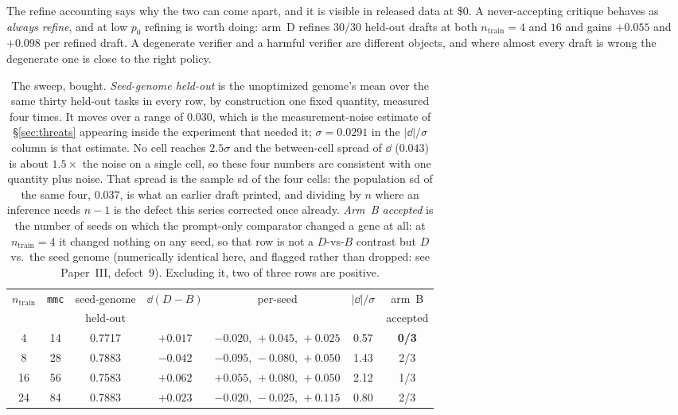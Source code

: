 \documentclass[11pt]{article}
\begin{document}
The refine accounting says why the two can come apart, and it is visible in released data at
\$0. A never-accepting critique behaves as \emph{always refine}, and at low $p_0$
refining is worth doing: arm~D refines $30/30$ held-out drafts at both $n_{\mathrm{train}}{=}4$
and $16$ and gains $+0.055$ and $+0.098$ per refined draft. A degenerate verifier and a harmful
verifier are different objects, and where almost every draft is wrong the degenerate one is
close to the right policy.

\begin{table}[h]
\centering
\small
\begin{tabular}{ccccccc}
\toprule
$n_{\mathrm{train}}$ & \texttt{mmc} & seed-genome & $\dd(D-B)$ & per-seed & $|\dd|/\sigma$ & arm~B \\
 & & held-out & & & & accepted \\
\midrule
4  & 14 & 0.7717 & $+0.017$ & $-0.020,\,+0.045,\,+0.025$ & 0.57 & \textbf{0/3} \\
8  & 28 & 0.7883 & $-0.042$ & $-0.095,\,-0.080,\,+0.050$ & 1.43 & 2/3 \\
16 & 56 & 0.7583 & $+0.062$ & $+0.055,\,+0.080,\,+0.050$ & 2.12 & 1/3 \\
24 & 84 & 0.7883 & $+0.023$ & $-0.020,\,-0.025,\,+0.115$ & 0.80 & 2/3 \\
\bottomrule
\end{tabular}
\caption{The sweep, bought. \emph{Seed-genome held-out} is the unoptimized genome's mean over
the same thirty held-out tasks in every row, by construction one fixed quantity, measured
four times. It moves over a range of $0.030$, which is the measurement-noise estimate of
\S\ref{sec:threats} appearing inside the experiment that needed it; $\sigma = 0.0291$ in the
$|\dd|/\sigma$ column is that estimate. No cell reaches $2.5\sigma$ and the between-cell
spread of $\dd$ ($0.043$) is about $1.5\times$ the noise on a single cell, so these four numbers
are consistent with one quantity plus noise. That spread is the sample sd of the four cells: the
population sd of the same four, $0.037$, is what an earlier draft printed, and dividing by $n$
where an inference needs $n-1$ is the defect this series corrected once already. \emph{Arm~B accepted} is the number of seeds on which
the prompt-only comparator changed a gene at all: at $n_{\mathrm{train}}{=}4$ it changed
nothing on any seed, so that row is not a $D$-vs-$B$ contrast but $D$ vs.\ the seed genome
(numerically identical here, and flagged rather than dropped: see Paper~III, defect~9).
Excluding it, two of three rows are positive.}
\label{tab:splitresults}
\end{table}
\end{document}
